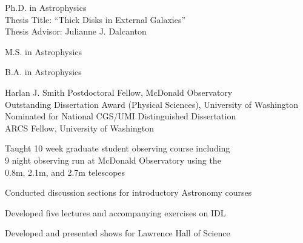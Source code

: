 \documentclass[10pt]{cv}
\begin{document}
\begin{llist}



Ph.D. in Astrophysics\\
Thesis Title:  ``Thick Disks in External Galaxies''\\
Thesis Advisor:  Julianne J. Dalcanton

M.S. in Astrophysics

B.A. in Astrophysics


Harlan J. Smith Postdoctoral Fellow, McDonald Observatory \\
Outstanding Dissertation Award (Physical Sciences), University of Washington 
\\
Nominated for National CGS/UMI Distinguished Dissertation 
\\
ARCS Fellow, University of Washington 


Taught 10 week graduate student observing course including \\
9 night observing run at McDonald Observatory using the\\
 0.8m, 2.1m, and 2.7m telescopes

Conducted discussion sections for introductory Astronomy courses

Developed five lectures and accompanying exercises on IDL

Developed and presented shows for Lawrence Hall of Science


\end{llist}
\end{document}
